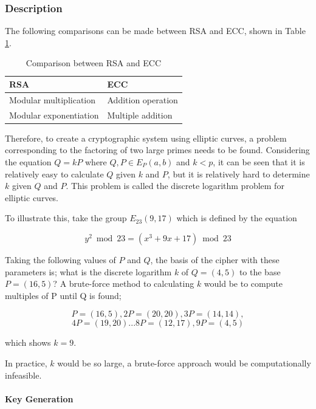 \documentclass[a4paper,10pt]{report}
\begin{document}
\subsubsection{Description}

The following comparisons can be made between RSA and ECC, shown in Table \ref{tab:eccrsa}.

\begin{table}[htb]
\begin{center}
    \begin{tabular}{| l | l | }
    \hline
    RSA & ECC\\ \hline
    Modular multiplication & Addition operation \\ \hline
    Modular exponentiation & Multiple addition \\
    \hline
    \end{tabular}
   \caption{Comparison between RSA and ECC}
    \label{tab:eccrsa}
\end{center}
\end{table} 

Therefore, to create a cryptographic system using elliptic curves, a problem corresponding to the factoring of two large primes needs to be found. Considering the equation $Q = kP$ where $Q, P \in E_{P}(a,b)$ and $k < p$, it can be seen that it is relatively easy to calculate $Q$ given $k$ and $P$, but it is relatively hard to determine $k$ given $Q$ and $P$. This problem is called the discrete logarithm problem for elliptic curves. 

To illustrate this, take the group $E_{23}(9,17)$ which is defined by the equation

\[ y^2 \bmod 23 = (x^3 + 9x + 17) \bmod 23 \]

Taking the following values of $P$ and $Q$, the basis of the cipher with these parameters is; what is the discrete logarithm $k$ of $Q = (4,5)$ to the base $P = (16,5)$? A brute-force method to calculating $k$ would be to compute multiples of P until Q is found;

\[ P = (16,5), 2P = (20,20), 3P = (14,14), \]
\[ 4P = (19,20) ... 8P = (12,17), 9P = (4,5) \]

which shows $k = 9$. 

In practice, $k$ would be so large, a brute-force approach would be computationally infeasible. 

\paragraph{Key Generation}
\end{document}
